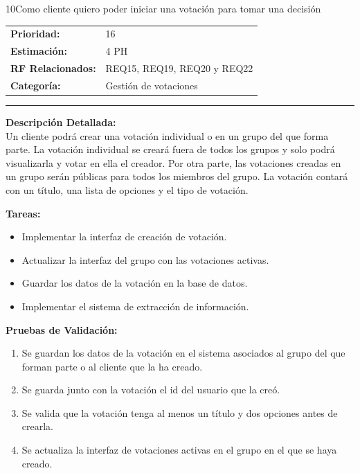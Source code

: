 \begin{hu_card}{10}{Como cliente quiero poder iniciar una votación para tomar una decisión}
    \begin{tabularx}{\linewidth}{l X}
        \textbf{Prioridad:}   & 16\\
        \textbf{Estimación:}  & 4 PH \\
        \textbf{RF Relacionados:} & REQ15, REQ19, REQ20 y REQ22 \\
        \textbf{Categoría:} & Gestión de votaciones \\
    \end{tabularx}

    \vspace{2mm}
    \hrule
    \vspace{2mm}

    \textbf{Descripción Detallada:} \\
    Un cliente podrá crear una votación individual o en un grupo del que forma parte. La votación individual se creará fuera de todos los grupos y solo podrá visualizarla y votar en ella el creador. Por otra parte, las votaciones creadas en un grupo serán públicas para todos los miembros del grupo. La votación contará con un título, una lista de opciones y el tipo de votación.

    \vspace{2mm}
    \textbf{Tareas:}
    \begin{itemize}[noitemsep, topsep=0pt]
        \item Implementar la interfaz de creación de votación.
        \item Actualizar la interfaz del grupo con las votaciones activas.
        \item Guardar los datos de la votación en la base de datos.
        \item Implementar el sistema de extracción de información.
    \end{itemize}

    \vspace{2mm}
    \textbf{Pruebas de Validación:}
    \begin{enumerate}[noitemsep, topsep=0pt]
        \item Se guardan los datos de la votación en el sistema asociados al grupo del que forman parte o al cliente que la ha creado.
        \item Se guarda junto con la votación el id del usuario que la creó.
        \item Se valida que la votación tenga al menos un título y dos opciones antes de crearla.
        \item Se actualiza la interfaz de votaciones activas en el grupo en el que se haya creado.
    \end{enumerate}
\end{hu_card}

